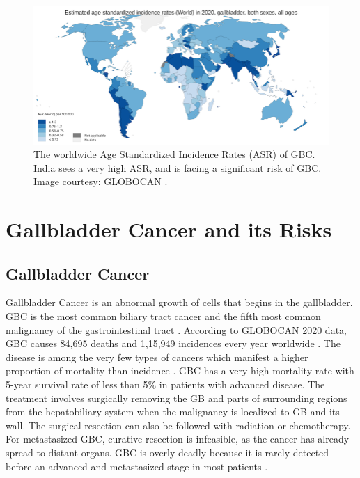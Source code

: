 \begin{figure}[t]
    \centering
    \includegraphics[width=0.8\linewidth]{figs/asr-map.png}
    \caption[The worldwide Age Standardized Incidence Rates (ASR) of GBC]{The worldwide Age Standardized Incidence Rates (ASR) of GBC. India sees a very high ASR, and is facing a significant risk of GBC. Image courtesy: GLOBOCAN \cite{bray2018global}.}
    \label{fig:asr_worldmap}
\end{figure}

\section{Gallbladder Cancer and its Risks}
%
\subsection{Gallbladder Cancer} 
Gallbladder Cancer is an abnormal growth of cells that begins in the gallbladder. GBC is the most common biliary tract cancer and the fifth most common malignancy of the gastrointestinal tract \cite{HBSN4726}. According to GLOBOCAN 2020 data, GBC causes 84,695 deaths and 1,15,949 incidences every year worldwide \cite{armitage2014abeloff, bray2018global}. The disease is among the very few types of cancers which manifest a higher proportion of mortality than incidence \cite{bray2018global}. GBC has a very high mortality rate with 5-year survival rate of less than 5\% in patients with advanced disease.
The treatment involves surgically removing the GB and parts of surrounding regions from the hepatobiliary system when the malignancy is localized to GB and its wall. The surgical resection can also be followed with radiation or chemotherapy. For metastasized GBC, curative resection is infeasible, as the cancer has already spread to distant organs. GBC is overly deadly because it is rarely detected before an advanced and metastasized stage in most patients \cite{batra2005gallbladder, randi2006gallbladder}. 


